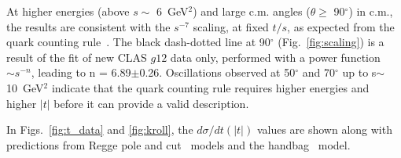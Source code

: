\documentclass[aps,prc,twocolumn,floatfix,showpacs,preprintnumbers,amsmath,amssymb,superscriptaddress]{revtex4-1}
\begin{document}
At higher energies (above $s\sim$ 6~GeV$^2$) and large c.m. angles 
($\theta\geq$ 90$^\circ$) in c.m., the results are consistent 
with the $s^{-7}$ scaling, at fixed $t/s$, as expected from the quark counting 
rule~\cite{Stan}. The black dash-dotted line at 90$^\circ$ 
(Fig.~\ref{fig:scaling}) is a result of the fit of new CLAS 
$g12$ data only, performed with a power function $\sim s^{-n}$, 
leading to n = 6.89$\pm$0.26.  Oscillations observed at 
50$^\circ$ and 70$^\circ$ up to s$\sim$10~GeV$^2$ indicate
that the quark counting rule requires higher energies and 
higher $|t|$ before it can provide a valid description.

In Figs.~\ref{fig:t_data} and \ref{fig:kroll}, the 
$d\sigma/dt(|t|)$ values are shown along with predictions from Regge 
pole and cut~\cite{Goldstein,Laget,Mathieu,Donnachie} models and the
handbag~\cite{Kroll} model. 
\end{document}
